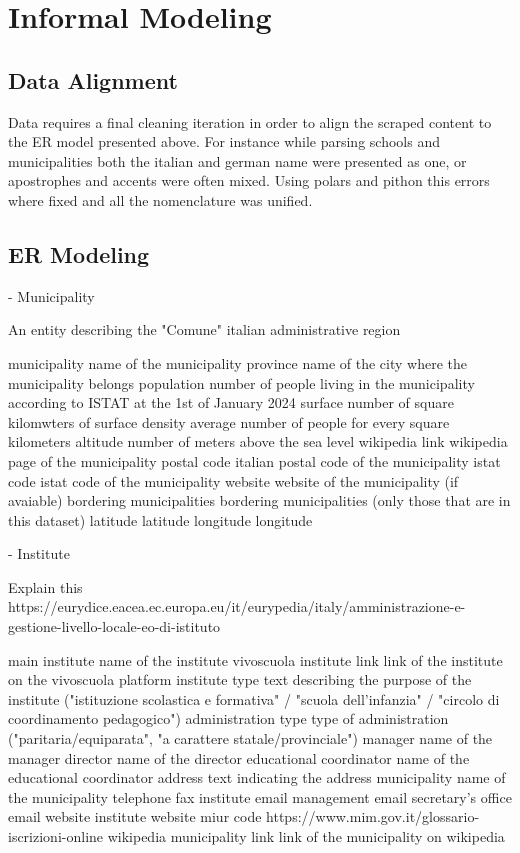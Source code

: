 \section{Informal Modeling}

\subsection{Data Alignment}
Data requires a final cleaning iteration in order to align the scraped content to the ER model presented above.
For instance while parsing schools and municipalities both the italian and german name were presented as one, or apostrophes and accents were often mixed.
Using polars and pithon this errors where fixed and all the nomenclature was unified.

\subsection{ER Modeling}

- Municipality

An entity describing the "Comune" italian administrative region

municipality name of the municipality
province name of the city where the municipality belongs
population number of people living in the municipality according to ISTAT at the 1st of January 2024
surface number of square kilomwters of surface
density average number of people for every square kilometers
altitude number of meters above the sea level
wikipedia link wikipedia page of the municipality
postal code italian postal code of the municipality
istat code istat code of the municipality
website website of the municipality (if avaiable)
bordering municipalities bordering municipalities (only those that are in this dataset)
latitude latitude
longitude longitude


- Institute

Explain this
https://eurydice.eacea.ec.europa.eu/it/eurypedia/italy/amministrazione-e-gestione-livello-locale-eo-di-istituto

main institute name of the institute
vivoscuola institute link link of the institute on the vivoscuola platform
institute type text describing the purpose of the institute ("istituzione scolastica e formativa" / "scuola dell'infanzia" / "circolo di coordinamento pedagogico")
administration type type of administration ("paritaria/equiparata", "a carattere statale/provinciale")
manager name of the manager
director name of the director
educational coordinator name of the educational coordinator
address text indicating the address
municipality name of the municipality
telephone
fax
institute email 
management email
secretary's office email
website institute website
miur code https://www.mim.gov.it/glossario-iscrizioni-online
wikipedia municipality link link of the municipality on wikipedia


